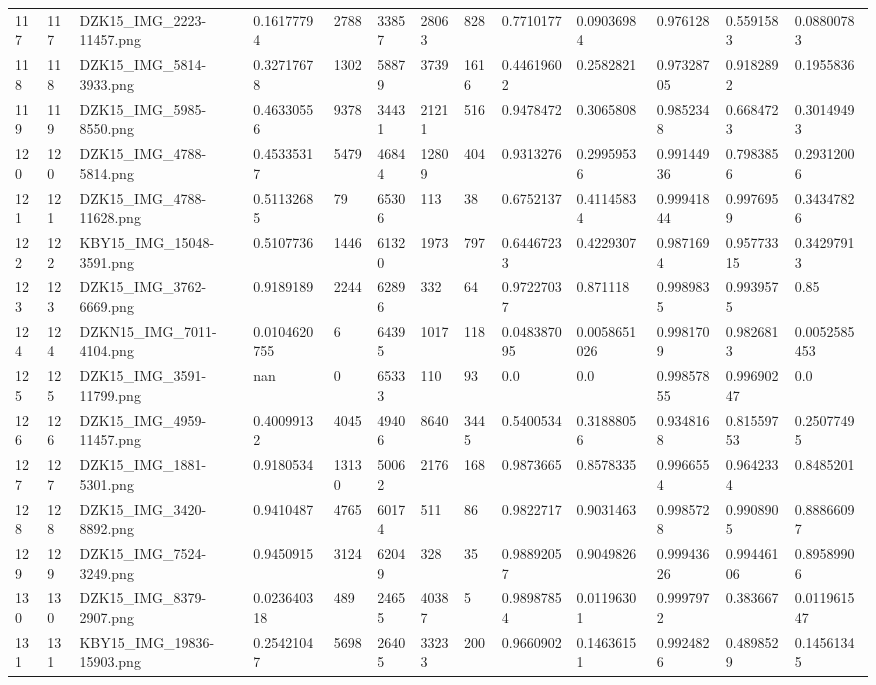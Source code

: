 \documentclass[11pt, a4paper, twoside]{report}
\begin{document}
\begin{longtable}[c]{@{}lllllllllllll@{}}
117 & 117 & DZK15\_IMG\_2223-11457.png & 0.16177794 & 2788 & 33857 & 28063 & 828 & 0.7710177 & 0.09036984 & 0.976128 & 0.5591583 & 0.08800783 \\
118 & 118 & DZK15\_IMG\_5814-3933.png & 0.32717678 & 1302 & 58879 & 3739 & 1616 & 0.44619602 & 0.2582821 & 0.97328705 & 0.9182892 & 0.1955836 \\
119 & 119 & DZK15\_IMG\_5985-8550.png & 0.46330556 & 9378 & 34431 & 21211 & 516 & 0.9478472 & 0.3065808 & 0.9852348 & 0.6684723 & 0.30149493 \\
120 & 120 & DZK15\_IMG\_4788-5814.png & 0.45335317 & 5479 & 46844 & 12809 & 404 & 0.9313276 & 0.29959536 & 0.99144936 & 0.7983856 & 0.29312006 \\
121 & 121 & DZK15\_IMG\_4788-11628.png & 0.51132685 & 79 & 65306 & 113 & 38 & 0.6752137 & 0.41145834 & 0.99941844 & 0.9976959 & 0.34347826 \\
122 & 122 & KBY15\_IMG\_15048-3591.png & 0.5107736 & 1446 & 61320 & 1973 & 797 & 0.64467233 & 0.4229307 & 0.9871694 & 0.95773315 & 0.34297913 \\
123 & 123 & DZK15\_IMG\_3762-6669.png & 0.9189189 & 2244 & 62896 & 332 & 64 & 0.97227037 & 0.871118 & 0.9989835 & 0.9939575 & 0.85 \\
124 & 124 & DZKN15\_IMG\_7011-4104.png & 0.0104620755 & 6 & 64395 & 1017 & 118 & 0.048387095 & 0.0058651026 & 0.9981709 & 0.9826813 & 0.0052585453 \\
125 & 125 & DZK15\_IMG\_3591-11799.png & nan & 0 & 65333 & 110 & 93 & 0.0 & 0.0 & 0.99857855 & 0.99690247 & 0.0 \\
126 & 126 & DZK15\_IMG\_4959-11457.png & 0.40099132 & 4045 & 49406 & 8640 & 3445 & 0.5400534 & 0.31888056 & 0.9348168 & 0.81559753 & 0.25077495 \\
127 & 127 & DZK15\_IMG\_1881-5301.png & 0.9180534 & 13130 & 50062 & 2176 & 168 & 0.9873665 & 0.8578335 & 0.9966554 & 0.9642334 & 0.8485201 \\
128 & 128 & DZK15\_IMG\_3420-8892.png & 0.9410487 & 4765 & 60174 & 511 & 86 & 0.9822717 & 0.9031463 & 0.9985728 & 0.9908905 & 0.88866097 \\
129 & 129 & DZK15\_IMG\_7524-3249.png & 0.9450915 & 3124 & 62049 & 328 & 35 & 0.98892057 & 0.9049826 & 0.99943626 & 0.99446106 & 0.89589906 \\
130 & 130 & DZK15\_IMG\_8379-2907.png & 0.023640318 & 489 & 24655 & 40387 & 5 & 0.98987854 & 0.01196301 & 0.9997972 & 0.383667 & 0.011961547 \\
131 & 131 & KBY15\_IMG\_19836-15903.png & 0.25421047 & 5698 & 26405 & 33233 & 200 & 0.9660902 & 0.14636151 & 0.9924826 & 0.4898529 & 0.14561345 \\

\end{longtable}
\end{document}
